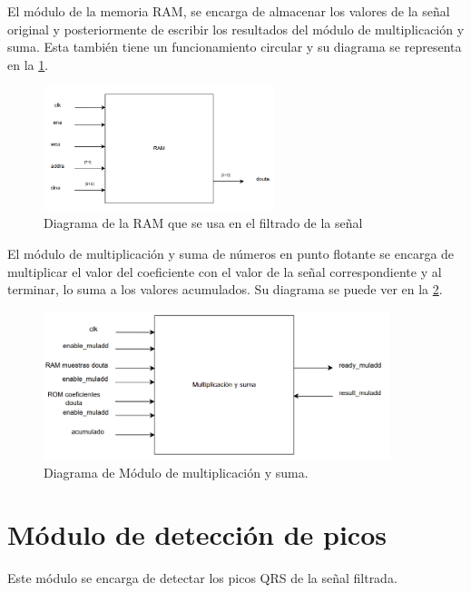 El módulo de la memoria RAM, se encarga de almacenar los valores de la señal original y posteriormente de escribir los resultados del módulo de multiplicación y suma. Esta también tiene un funcionamiento circular y su diagrama se representa en la \cref{fig:diagramamoduloRAM}.

\begin{figure}[h!]
    \centering
    \includegraphics[width=0.6\textwidth]{./Images/img_implementacion_hw/diagramamoduloRAM.png}
    \caption{Diagrama de la RAM que se usa en el filtrado de la señal}
    \label{fig:diagramamoduloRAM}
\end{figure} 
\FloatBarrier

El módulo de multiplicación y suma de números en punto flotante se encarga de multiplicar el valor del coeficiente con el valor de la señal correspondiente y al terminar, lo suma a los valores acumulados. Su diagrama se puede ver en la \cref{fig:diagramamodulomultiplicacionysuma}.
\begin{figure}[h!]
    \centering
    \includegraphics[width=0.9\textwidth]{./Images/img_implementacion_hw/diagramamodulomultiplicacionysuma.png}
    \caption{Diagrama de Módulo de multiplicación y suma.}
    \label{fig:diagramamodulomultiplicacionysuma}
\end{figure}
\FloatBarrier
\section{Módulo de detección de picos}

Este módulo se encarga de detectar los picos QRS de la señal filtrada.
